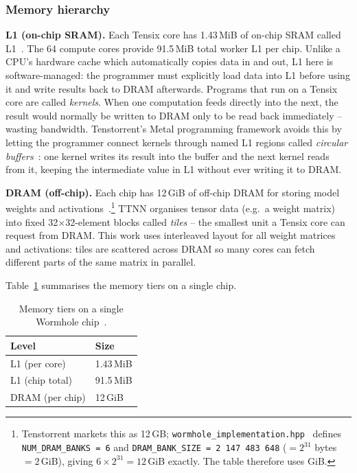 \subsubsection{Memory hierarchy}

\textbf{L1 (on-chip SRAM).} Each Tensix core has 1.43\,MiB of on-chip SRAM called L1~\citep{tenstorrent_wormhole}. The 64 compute cores provide 91.5\,MiB total worker L1 per chip. Unlike a CPU's hardware cache which automatically copies data in and out, L1 here is software-managed: the programmer must explicitly load data into L1 before using it and write results back to DRAM afterwards. Programs that run on a Tensix core are called \emph{kernels}. When one computation feeds directly into the next, the result would normally be written to DRAM only to be read back immediately -- wasting bandwidth. Tenstorrent's Metal programming framework avoids this by letting the programmer connect kernels through named L1 regions called \emph{circular buffers}~\citep{ttmetal_buffertypes}: one kernel writes its result into the buffer and the next kernel reads from it, keeping the intermediate value in L1 without ever writing it to DRAM.

\textbf{DRAM (off-chip).} Each chip has 12\,GiB of off-chip DRAM for storing model weights and activations~\citep{tenstorrent_wormhole}.\footnote{Tenstorrent markets this as 12\,GB; \texttt{wormhole\_implementation.hpp}~\citep{ttmetal_whdram} defines \texttt{NUM\_DRAM\_BANKS\,=\,6} and \texttt{DRAM\_BANK\_SIZE\,=\,2\,147\,483\,648} ($= 2^{31}$ bytes $= 2$\,GiB), giving $6 \times 2^{31} = 12$\,GiB exactly. The table therefore uses GiB.} TTNN organises tensor data (e.g.\ a weight matrix) into fixed 32$\times$32-element blocks called \emph{tiles} -- the smallest unit a Tensix core can request from DRAM. This work uses interleaved layout for all weight matrices and activations: tiles are scattered across DRAM so many cores can fetch different parts of the same matrix in parallel.

Table~\ref{tab:mem} summarises the memory tiers on a single chip.

\begin{table}[h]
\caption{Memory tiers on a single Wormhole chip~\citep{tenstorrent_wormhole}.}
\label{tab:mem}
\begin{tabular}{ll}
\toprule
Level & Size \\
\midrule
L1 (per core) & 1.43\,MiB \\
L1 (chip total) & 91.5\,MiB \\
DRAM (per chip) & 12\,GiB \\
\bottomrule
\end{tabular}
\end{table}

